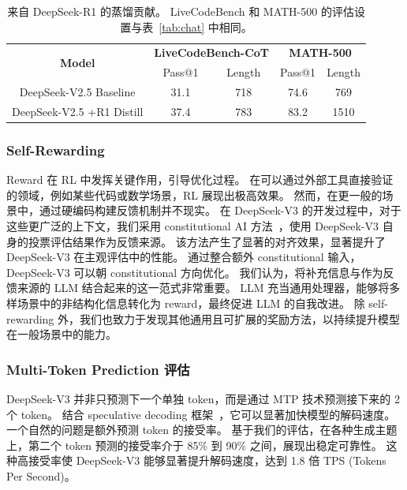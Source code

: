 \documentclass[11pt, a4paper, logo, copyright, nonumbering]{deepseek}
\newcommand{\dsviii}{DeepSeek-V3}
\begin{document}
\begin{table}[t]
    \centering
    \begin{tabular}{c|cc|cc}
    \toprule
    \multirow{2}{*}{\textbf{Model}} & \multicolumn{2}{c}{\textbf{LiveCodeBench-CoT}} & \multicolumn{2}{c}{\textbf{MATH-500}} \\

     & Pass@1 & Length & Pass@1 & Length\\
    \midrule
     DeepSeek-V2.5 Baseline & 31.1 & 718 & 74.6 & 769\\
     DeepSeek-V2.5 +R1 Distill & 37.4 & 783 &83.2& 1510\\
    \bottomrule
    \end{tabular}
    \caption{
    来自 DeepSeek-R1 的蒸馏贡献。
    LiveCodeBench 和 MATH-500 的评估设置与表~\ref{tab:chat} 中相同。
    }
    \label{tab:distill} 
\end{table}

\subsubsection{Self-Rewarding}

Reward 在 RL 中发挥关键作用，引导优化过程。
在可以通过外部工具直接验证的领域，例如某些代码或数学场景，RL 展现出极高效果。
然而，在更一般的场景中，通过硬编码构建反馈机制并不现实。
在 \dsviii{} 的开发过程中，对于这些更广泛的上下文，我们采用 constitutional AI 方法~\citep{bai2022constitutional}，使用 \dsviii{} 自身的投票评估结果作为反馈来源。
该方法产生了显著的对齐效果，显著提升了 \dsviii{} 在主观评估中的性能。
通过整合额外 constitutional 输入，\dsviii{} 可以朝 constitutional 方向优化。
我们认为，将补充信息与作为反馈来源的 LLM 结合起来的这一范式非常重要。
LLM 充当通用处理器，能够将多样场景中的非结构化信息转化为 reward，最终促进 LLM 的自我改进。
除 self-rewarding 外，我们也致力于发现其他通用且可扩展的奖励方法，以持续提升模型在一般场景中的能力。

\subsubsection{Multi-Token Prediction 评估}

\dsviii{} 并非只预测下一个单独 token，而是通过 MTP 技术预测接下来的 2 个 token。
结合 speculative decoding 框架~\citep{speculative_google,speculative_xhm}，它可以显著加快模型的解码速度。
一个自然的问题是额外预测 token 的接受率。
基于我们的评估，在各种生成主题上，第二个 token 预测的接受率介于 85\% 到 90\% 之间，展现出稳定可靠性。
这种高接受率使 \dsviii{} 能够显著提升解码速度，达到 1.8 倍 TPS (Tokens Per Second)。
\end{document}

